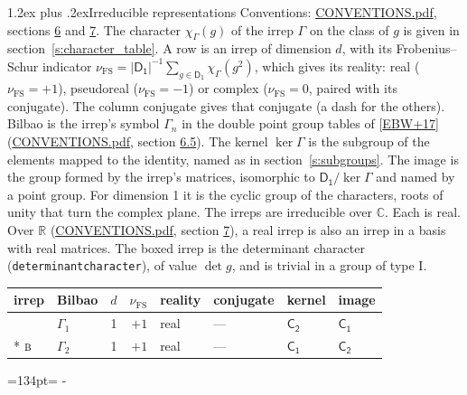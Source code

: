\documentclass[10pt,a4paper]{article}
\makeatletter
\renewcommand\section{\@startsection{section}{1}{\z@}{-3ex plus -1ex minus -.2ex}%
  {1.2ex plus .2ex}{\normalfont\large\sffamily\bfseries\color{parttitle}}}
\newcommand{\needspace}[1]{\par\penalty-100\begingroup\dimen0=#1\relax\dimen2=\pagegoal
  \advance\dimen2-\pagetotal\ifdim\dimen0>\dimen2\relax\ifdim\dimen2>0pt\vfil\break\fi\fi
  \endgroup}
\numberwithin{equation}{section}
\newcommand{\grp}[1]{\mathsf{#1}}
\newcommand{\irr}[1]{\text{\normalfont\scshape #1}}
\newcommand{\detbox}[1]{{\setlength{\fboxsep}{1pt}\fbox{#1}}}
\newcommand{\irchar}[1]{\chi_{#1}}
\newcommand{\fsind}{\nu_{\mathrm{FS}}}
\makeatother
\begin{document}
\section{Irreducible representations}\label{s:irreps}
Conventions: \href{../../CONVENTIONS.pdf}{CONVENTIONS.pdf}, sections \href{../../CONVENTIONS.pdf\#conv.6}{6} and \href{../../CONVENTIONS.pdf\#conv.7}{7}.
\leavevmode\label{n:function.character}\label{n:irrep.Gamma}The character $\irchar{\Gamma}(g)$ of the irrep $\Gamma$ on the class of $g$ is given in section~\ref{s:character_table}.
\leavevmode\label{n:index.dimension}\label{n:index.frobenius}\label{n:head.irrep}\label{n:head.reality}A row is an irrep of dimension $d$, with its Frobenius--Schur indicator $\fsind = |\grp{D_{1}}|^{-1}\allowbreak\sum_{g\in\grp{D_{1}}}\irchar{\Gamma}(g^2)$, which gives its reality: real ($\fsind = +1$), pseudoreal ($\fsind = -1$) or complex ($\fsind = 0$, paired with its conjugate). \label{n:head.conjugate}The column conjugate gives that conjugate (a dash for the others). \label{n:head.bilbao}\label{n:irrep.alias.gamma}Bilbao is the irrep's symbol $\Gamma_n$ in the double point group tables of [\href{../../../REFERENCES.pdf\#ref.EBW+17}{EBW+17}] (\href{../../CONVENTIONS.pdf}{CONVENTIONS.pdf}, section \href{../../CONVENTIONS.pdf\#conv.6.5}{6.5}). \label{n:head.kernel}The kernel $\ker\Gamma$ is the subgroup of the elements mapped to the identity, named as in section~\ref{s:subgroups}. \label{n:head.image}The image is the group formed by the irrep's matrices, isomorphic to $\grp{D_{1}}/\ker\Gamma$ and named by a point group. For dimension 1 it is the cyclic group of the characters, roots of unity that turn the complex plane. The irreps are irreducible over $\mathbb{C}$. Each is real. Over $\mathbb{R}$ (\href{../../CONVENTIONS.pdf}{CONVENTIONS.pdf}, section \href{../../CONVENTIONS.pdf\#conv.7}{7}), a real irrep is also an irrep in a basis with real matrices. \label{n:mark.determinant}The boxed irrep is the determinant character (\texttt{determinantcharacter}), of value $\det g$, and is trivial in a group of type I.
\setlength{\emergencystretch}{2em}\par\setlength{\emergencystretch}{0pt}
{\small\renewcommand{\arraystretch}{1.25}\begin{longtable}{@{}llrrllll@{}}\toprule
irrep & Bilbao & $d$ & $\fsind$ & reality & conjugate & kernel & image\\\midrule\endhead
\bottomrule\endfoot\endlastfoot
\detbox{$\irr{a}$} & $\Gamma_{1}$ & 1 & $+1$ & real & --- & \href{C2.pdf}{$\grp{C_{2}}$} & \href{C1.pdf}{$\grp{C_{1}}$}\\*
$\irr{b}$ & $\Gamma_{2}$ & 1 & $+1$ & real & --- & \href{C1.pdf}{$\grp{C_{1}}$} & \href{C2.pdf}{$\grp{C_{2}}$}\\
\bottomrule\end{longtable}}
\needspace{134pt}
\end{document}
